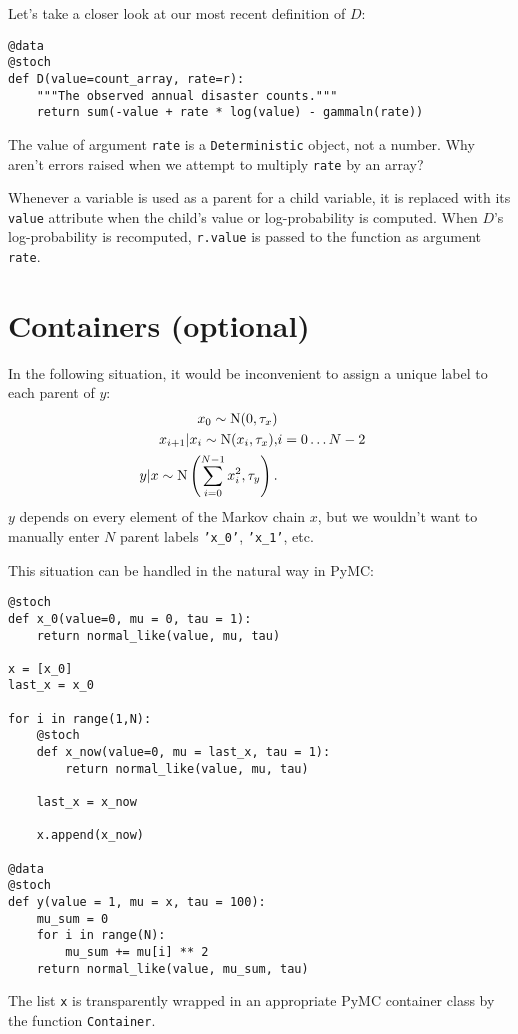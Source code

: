Let's take a closer look at our most recent definition of $D$:
\begin{verbatim}
@data
@stoch
def D(value=count_array, rate=r):
    """The observed annual disaster counts."""
    return sum(-value + rate * log(value) - gammaln(rate))
\end{verbatim}
The value of argument \texttt{rate} is a \texttt{Deterministic} object, not a number. Why aren't errors raised when we attempt to multiply \texttt{rate} by an array?

Whenever a variable is used as a parent for a child variable, it is replaced with its \texttt{value} attribute when the child's value or log-probability is computed. When $D$'s log-probability is recomputed, \texttt{r.value} is passed to the function as argument \texttt{rate}. 

\section{Containers (optional)}\label{sub:container}
In the following situation, it would be inconvenient to assign a unique label to each parent of $y$:
\begin{eqnarray*}
    x_0 \sim \textup N(0,\tau_x)\\
    x_{i+1}|x_i\sim\textup{N}(x_i, \tau_x),& i=0\ldots N-2\\
    y|x \sim \textup N\left(\sum_{i=0}^{N-1}x_i^2,\tau_y\right).
\end{eqnarray*}
$y$ depends on every element of the Markov chain $x$, but we wouldn't want to manually enter $N$ parent labels \texttt{'x_0'}, \texttt{'x\_1'}, etc.

This situation can be handled in the natural way in PyMC:
\begin{verbatim}
@stoch
def x_0(value=0, mu = 0, tau = 1):
    return normal_like(value, mu, tau)

x = [x_0]
last_x = x_0

for i in range(1,N):          
    @stoch
    def x_now(value=0, mu = last_x, tau = 1):
        return normal_like(value, mu, tau)
        
    last_x = x_now
    
    x.append(x_now)

@data
@stoch
def y(value = 1, mu = x, tau = 100):
    mu_sum = 0
    for i in range(N):
        mu_sum += mu[i] ** 2
    return normal_like(value, mu_sum, tau)
\end{verbatim}
The list \texttt{x} is transparently wrapped in an appropriate PyMC container class by the function \texttt{Container}.

